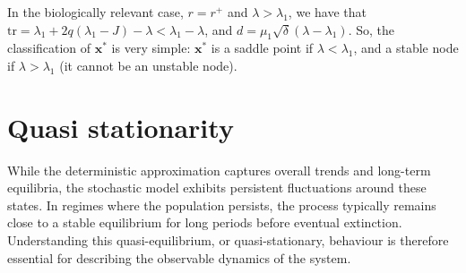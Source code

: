 \documentclass[12pt]{article}
\newcommand{\tr}{\text{tr}}
\newcommand{\bx}{\boldsymbol{x}}
\begin{document}
%
%
In the biologically relevant case, $r=r^+$ and $\lambda>\lambda_1$, we 
have that $\tr = \lambda_1 +
2q(\lambda_1- J)-\lambda <\lambda_1-\lambda$, and
$d=\mu_1\sqrt{\delta}(\lambda-\lambda_1)$. So, the classification of
$\bx^*$ is very simple:
$\bx^*$ is a saddle point if $\lambda<\lambda_1$, and a stable node if
$\lambda>\lambda_1$ (it cannot be an unstable node).

\section{Quasi stationarity}

While the deterministic approximation captures overall trends and
long-term equilibria, the stochastic model exhibits persistent
fluctuations around these states. In regimes where the population
persists, the process typically remains close to a stable equilibrium
for long periods before eventual extinction. Understanding this
quasi-equilibrium, or quasi-stationary, 
behaviour is therefore essential for describing the
observable dynamics of the system.
\end{document}
